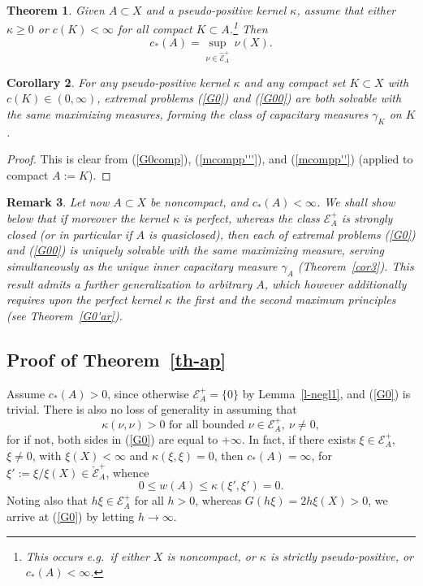 \documentclass[12pt,a4paper,reqno]{amsart} %
\theoremstyle{lause}
\theoremstyle{maaritelma}
\theoremstyle{lause}
\newtheorem{theorem}{Theorem}[section]
\newtheorem{corollary}[theorem]{Corollary}
\theoremstyle{maaritelma}
\newtheorem{remark}[theorem]{Remark}
\numberwithin{equation}{section}
\begin{document}
\begin{theorem}\label{cor52}Given\/ $A\subset X$ and a pse\-udo-pos\-itive kernel\/ $\kappa$, assume that either\/ $\kappa\geqslant0$ or\/ $c(K)<\infty$ for all compact\/ $K\subset A$.\footnote{This occurs e.g.\ if either $X$ is noncompact, or $\kappa$ is strictly pse\-udo-pos\-itive, or $c_*(A)<\infty$.} Then
\begin{equation}\label{G00}c_*(A)=\sup_{\nu\in\widehat{\mathcal E}^+_A}\,\nu(X).\end{equation}
\end{theorem}

\begin{corollary}\label{cor52'}For any pse\-udo-pos\-itive kernel\/ $\kappa$ and any compact set\/ $K\subset X$ with\/ $c(K)\in(0,\infty)$, extremal problems\/ {\rm(\ref{G0})} and\/ {\rm(\ref{G00})} are both solvable with the same maximizing measures, forming the class of capacitary measures\/ $\gamma_K$ on\/ $K$.\end{corollary}

\begin{proof}
  This is clear from (\ref{G0comp}), (\ref{mcompp'''}), and (\ref{mcompp''}) (applied to compact $A:=K$).
\end{proof}

\begin{remark} Let now $A\subset X$ be {\it noncompact}, and $c_*(A)<\infty$. We shall show below that if moreover the kernel $\kappa$ is {\it perfect}, whereas the class $\mathcal E^+_A$ is {\it strongly closed\/} (or in particular if $A$ is quasiclosed), then each of extremal problems (\ref{G0}) and (\ref{G00}) is uniquely solvable with the same maximizing measure, serving simultaneously as the unique inner capacitary measure $\gamma_A$ (Theorem~\ref{cor3}). This result admits a further generalization to {\it arbitrary\/} $A$, which however additionally requires upon the perfect kernel $\kappa$ {\it the first and the second maximum principles\/} (see Theorem~\ref{G0'ar}).\end{remark}

\subsection{Proof of Theorem~\ref{th-ap}}\label{proof} Assume $c_*(A)>0$, since otherwise $\mathcal E^+_A=\{0\}$ by Lemma~\ref{l-negl1}, and (\ref{G0}) is trivial. There is also no loss of generality in assuming that
\begin{equation}\label{b1}\kappa(\nu,\nu)>0\text{ \ for all bounded\ }\nu\in\mathcal E^+_A, \ \nu\ne0,\end{equation}
for if not, both sides in (\ref{G0}) are equal to $+\infty$. In fact, if there exists $\xi\in\mathcal E^+_A$, $\xi\ne0$, with $\xi(X)<\infty$ and $\kappa(\xi,\xi)=0$, then $c_*(A)=\infty$, for $\xi':=\xi/\xi(X)\in\breve{\mathcal E}^+_A$, whence
\[0\leqslant w(A)\leqslant\kappa(\xi',\xi')=0.\] Noting also that $h\xi\in\mathcal E^+_A$ for all $h>0$, whereas $G(h\xi)=2h\xi(X)>0$, we arrive at (\ref{G0}) by letting $h\to\infty$.
\end{document}
